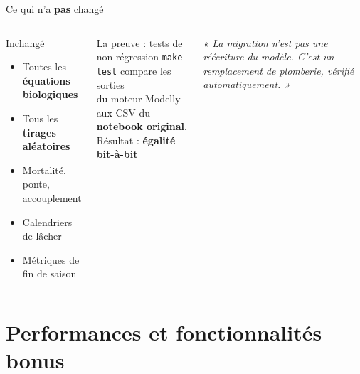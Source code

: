 \documentclass[aspectratio=169, 11pt]{beamer}
\newcommand{\okmark}{\textcolor{good}{\textbf{\checkmark}}}
\begin{document}
\begin{frame}{Ce qui n'a \textbf{pas} changé}

  \begin{columns}[T]
      \begin{block}{\okmark\; Inchangé}
        \begin{itemize}\setlength\itemsep{5pt}
          \item Toutes les \textbf{équations biologiques}
          \item Tous les \textbf{tirages aléatoires}
          \item Mortalité, ponte, accouplement
          \item Calendriers de lâcher
          \item Métriques de fin de saison
        \end{itemize}
      \end{block}

      \begin{alertblock}{La preuve : tests de non-régression}
        \texttt{make test} compare les sorties\\du moteur Modelly\\
        aux CSV du \textbf{notebook original}.\\[8pt]
        Résultat : \textcolor{good}{\textbf{égalité bit-à-bit \okmark}}
      \end{alertblock}

      \bigskip
      {\small\itshape « La migration n'est pas une réécriture du modèle. C'est un remplacement de plomberie, vérifié automatiquement. »}
  \end{columns}

\end{frame}

\section{Performances et fonctionnalités bonus}
\end{document}
